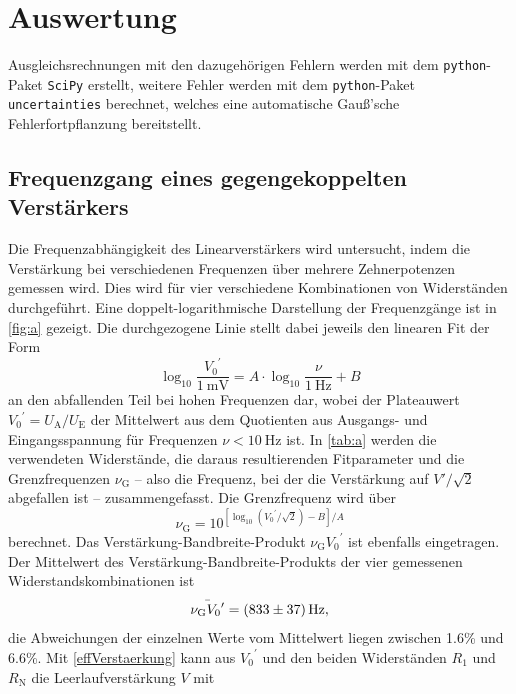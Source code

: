 \section{Auswertung}
\label{sec:evaluation}
Ausgleichsrechnungen mit den dazugehörigen Fehlern werden mit dem \texttt{python}-Paket \texttt{SciPy} \cite{scipy} erstellt, weitere Fehler werden mit dem \texttt{python}-Paket \texttt{uncertainties} \cite{uncertain} berechnet, welches eine automatische Gauß'sche Fehlerfortpflanzung bereitstellt.

\subsection{Frequenzgang eines gegengekoppelten Verst\"{a}rkers}
\label{Frequenzgang}
Die Frequenzabhängigkeit des Linearverstärkers wird untersucht, indem die Verstärkung bei verschiedenen Frequenzen über mehrere Zehnerpotenzen gemessen wird. Dies wird für vier verschiedene Kombinationen von Widerständen durchgeführt. Eine doppelt-logarithmische Darstellung der Frequenzgänge ist in \autoref{fig:a} gezeigt. Die durchgezogene Linie stellt dabei jeweils den linearen Fit der Form
\begin{equation}
	\log_{10} \frac{{V_0}^\prime}{\SI{1}{\milli\volt}} = A \cdot \log_{10} \frac{\nu}{\SI{1}{\hertz}} + B
	\label{linear_fit}
\end{equation}
an den abfallenden Teil bei hohen Frequenzen dar, wobei der Plateauwert ${V_0}^\prime = U_\text{A} / U_\text{E}$ der Mittelwert aus dem Quotienten aus Ausgangs- und Eingangsspannung für Frequenzen $\nu < \SI{10}{\hertz}$ ist. In \autoref{tab:a} werden die verwendeten Widerstände, die daraus resultierenden Fitparameter und die Grenzfrequenzen $\nu_\text{G}$ -- also die Frequenz, bei der die Verstärkung auf $V'/\sqrt{2}$ abgefallen ist -- zusammengefasst. Die Grenzfrequenz wird über
\begin{equation*}
	\nu_\text{G} = 10^{\left[\log_{10}\left({V_0}^\prime/\sqrt{2}\right) - B\right] / A}
\end{equation*}
berechnet. Das Verstärkung-Bandbreite-Produkt $\nu_\text{G}{V_0}^\prime$ ist ebenfalls eingetragen. Der Mittelwert des Verstärkung-Bandbreite-Produkts der vier gemessenen Widerstandskombinationen ist
\begin{equation*}
	\bar{\nu_\text{G}{V_0}^\prime} = \SI{833 \pm 37}{\hertz},
\end{equation*}
die Abweichungen der einzelnen Werte vom Mittelwert liegen zwischen 1.6\% und 6.6\%. Mit \autoref{effVerstaerkung} kann aus ${V_0}^\prime$ und den beiden Widerständen $R_1$ und $R_\text{N}$ die Leerlaufverstärkung $V$ mit
